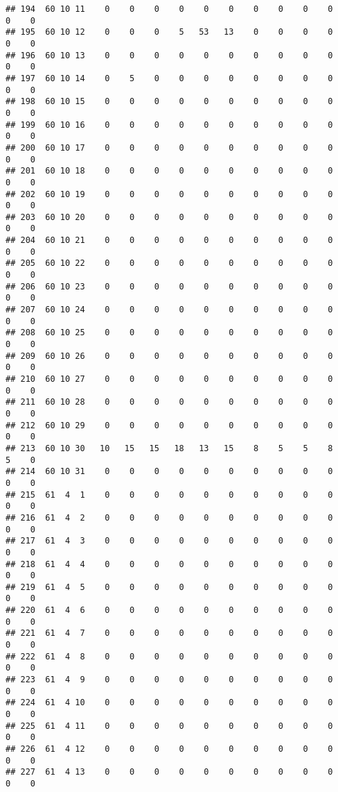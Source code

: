 \documentclass[]{article}
\begin{document}
\begin{verbatim}
## 194  60 10 11    0    0    0    0    0    0    0    0    0    0    0    0
## 195  60 10 12    0    0    0    5   53   13    0    0    0    0    0    0
## 196  60 10 13    0    0    0    0    0    0    0    0    0    0    0    0
## 197  60 10 14    0    5    0    0    0    0    0    0    0    0    0    0
## 198  60 10 15    0    0    0    0    0    0    0    0    0    0    0    0
## 199  60 10 16    0    0    0    0    0    0    0    0    0    0    0    0
## 200  60 10 17    0    0    0    0    0    0    0    0    0    0    0    0
## 201  60 10 18    0    0    0    0    0    0    0    0    0    0    0    0
## 202  60 10 19    0    0    0    0    0    0    0    0    0    0    0    0
## 203  60 10 20    0    0    0    0    0    0    0    0    0    0    0    0
## 204  60 10 21    0    0    0    0    0    0    0    0    0    0    0    0
## 205  60 10 22    0    0    0    0    0    0    0    0    0    0    0    0
## 206  60 10 23    0    0    0    0    0    0    0    0    0    0    0    0
## 207  60 10 24    0    0    0    0    0    0    0    0    0    0    0    0
## 208  60 10 25    0    0    0    0    0    0    0    0    0    0    0    0
## 209  60 10 26    0    0    0    0    0    0    0    0    0    0    0    0
## 210  60 10 27    0    0    0    0    0    0    0    0    0    0    0    0
## 211  60 10 28    0    0    0    0    0    0    0    0    0    0    0    0
## 212  60 10 29    0    0    0    0    0    0    0    0    0    0    0    0
## 213  60 10 30   10   15   15   18   13   15    8    5    5    8    5    0
## 214  60 10 31    0    0    0    0    0    0    0    0    0    0    0    0
## 215  61  4  1    0    0    0    0    0    0    0    0    0    0    0    0
## 216  61  4  2    0    0    0    0    0    0    0    0    0    0    0    0
## 217  61  4  3    0    0    0    0    0    0    0    0    0    0    0    0
## 218  61  4  4    0    0    0    0    0    0    0    0    0    0    0    0
## 219  61  4  5    0    0    0    0    0    0    0    0    0    0    0    0
## 220  61  4  6    0    0    0    0    0    0    0    0    0    0    0    0
## 221  61  4  7    0    0    0    0    0    0    0    0    0    0    0    0
## 222  61  4  8    0    0    0    0    0    0    0    0    0    0    0    0
## 223  61  4  9    0    0    0    0    0    0    0    0    0    0    0    0
## 224  61  4 10    0    0    0    0    0    0    0    0    0    0    0    0
## 225  61  4 11    0    0    0    0    0    0    0    0    0    0    0    0
## 226  61  4 12    0    0    0    0    0    0    0    0    0    0    0    0
## 227  61  4 13    0    0    0    0    0    0    0    0    0    0    0    0

\end{verbatim}
\end{document}
